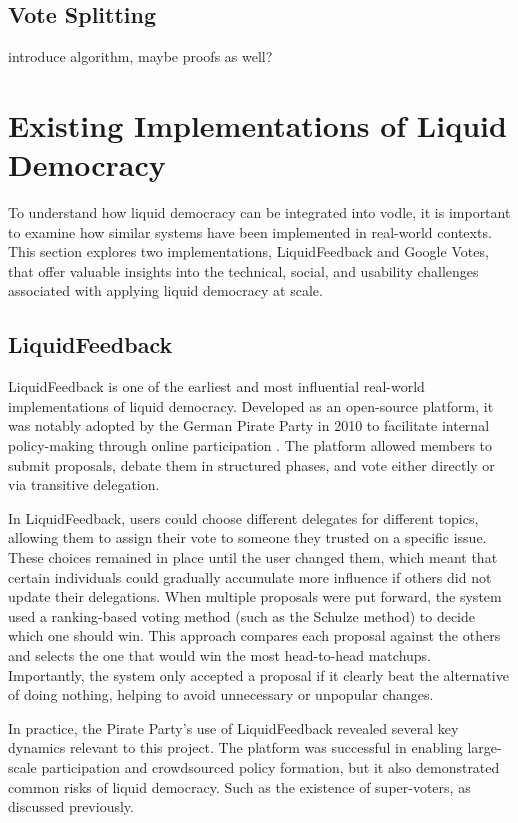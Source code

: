 \subsection*{Vote Splitting}\label{sub-section:vote-splitting}
introduce algorithm, maybe proofs as well?

\section{Existing Implementations of Liquid Democracy}
To understand how liquid democracy can be integrated into vodle, it is important to examine how similar systems have been implemented in real-world contexts. 
This section explores two implementations, LiquidFeedback and Google Votes, that offer valuable insights into the technical, social, and usability challenges associated with applying liquid democracy at scale.
\subsection{LiquidFeedback}
LiquidFeedback is one of the earliest and most influential real-world implementations of liquid democracy. Developed as an open-source platform, it was notably adopted by the German Pirate Party in 2010 to facilitate internal policy-making through online participation \citep{behrens_liquidfeedback_2014}. The platform allowed members to submit proposals, debate them in structured phases, and vote either directly or via transitive delegation.

In LiquidFeedback, users could choose different delegates for different topics, allowing them to assign their vote to someone they trusted on a specific issue. These choices remained in place until the user changed them, which meant that certain individuals could gradually accumulate more influence if others did not update their delegations. When multiple proposals were put forward, the system used a ranking-based voting method (such as the Schulze method) to decide which one should win. This approach compares each proposal against the others and selects the one that would win the most head-to-head matchups. Importantly, the system only accepted a proposal if it clearly beat the alternative of doing nothing, helping to avoid unnecessary or unpopular changes.

In practice, the Pirate Party's use of LiquidFeedback revealed several key dynamics relevant to this project. The platform was successful in enabling large-scale participation and crowdsourced policy formation, but it also demonstrated common risks of liquid democracy. Such as the existence of super-voters, as discussed previously.

